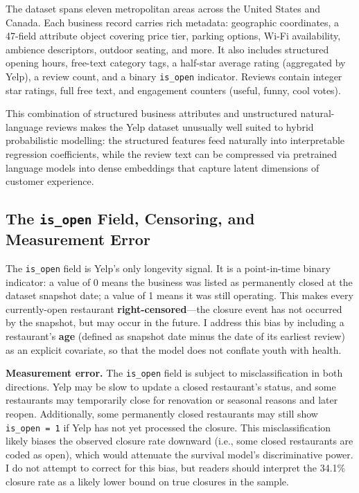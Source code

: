 \documentclass[10pt, letterpaper]{article}
\begin{document}
The dataset spans eleven metropolitan areas across the United States and Canada. Each business record carries rich metadata: geographic coordinates, a 47-field attribute object covering price tier, parking options, Wi-Fi availability, ambience descriptors, outdoor seating, and more. It also includes structured opening hours, free-text category tags, a half-star average rating (aggregated by Yelp), a review count, and a binary \texttt{is\_open} indicator. Reviews contain integer star ratings, full free text, and engagement counters (useful, funny, cool votes).

This combination of structured business attributes and unstructured natural-language reviews makes the Yelp dataset unusually well suited to hybrid probabilistic modelling: the structured features feed naturally into interpretable regression coefficients, while the review text can be compressed via pretrained language models into dense embeddings that capture latent dimensions of customer experience.

\subsection{The \texttt{is\_open} Field, Censoring, and Measurement Error}

The \texttt{is\_open} field is Yelp's only longevity signal. It is a point-in-time binary indicator: a value of 0 means the business was listed as permanently closed at the dataset snapshot date; a value of 1 means it was still operating. This makes every currently-open restaurant \textbf{right-censored}---the closure event has not occurred by the snapshot, but may occur in the future. I address this bias by including a restaurant's \textbf{age} (defined as snapshot date minus the date of its earliest review) as an explicit covariate, so that the model does not conflate youth with health.

\textbf{Measurement error.} The \texttt{is\_open} field is subject to misclassification in both directions. Yelp may be slow to update a closed restaurant's status, and some restaurants may temporarily close for renovation or seasonal reasons and later reopen. Additionally, some permanently closed restaurants may still show \texttt{is\_open = 1} if Yelp has not yet processed the closure. This misclassification likely biases the observed closure rate downward (i.e., some closed restaurants are coded as open), which would attenuate the survival model's discriminative power. I do not attempt to correct for this bias, but readers should interpret the 34.1\% closure rate as a likely lower bound on true closures in the sample.
\end{document}

